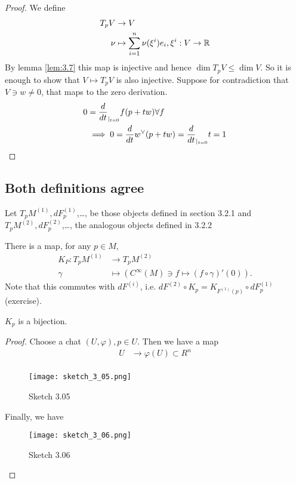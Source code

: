 \begin{proof} %
    We define \begin{align*}
        T_p V &\to V\\
        \nu&\mapsto \sum_{i=1}^n\nu(\xi^i)e_i,\xi^i:V\to \mathbb{R}
    \end{align*}
    By lemma \ref{lem:3.7} this map is injective and hence \(\dim T_pV \leq \dim V\). So it is enough to show that \(V\mapsto T_pV\) is also injective. 
    Suppose for contradiction that \(V\ni w\neq 0\), that maps to the zero derivation.
    \begin{align*}
        0&=\frac{d}{dt}_{|_{t=0}}f(p+tw)\forall f\\
        &\implies 0=\frac{d}{dt}w^\vee(p+tw)=\frac{d}{dt}_{|_{t=0}}t=1 \qedhere
    \end{align*}
\end{proof}

\subsection{Both definitions agree}
 Let \(T_pM^{(1)},dF_p^{(1)}\),\dots, be those objects defined in section 3.2.1 
and  \(T_pM^{(2)},dF_p^{(2)}\),\dots, the analogous objects defined in 3.2.2 

 There is a  map, for any  \(p\in M\),
\begin{align*}
    K_P:T_pM^{(1)}&\to T_pM^{(2)}\\
    \gamma& \mapsto (C^\infty(M)\ni f\mapsto (f\circ \gamma)'(0)).
\end{align*}
Note that this commutes with \(dF^{(i)}\), i.e. \(dF^{(2)}\circ K_p=K_{F^{(1)}(p)}\circ dF_p^{(1)}\) (exercise).

\begin{proposition}\label{prop:3.9}
    \(K_p\) is a bijection.
\end{proposition}

\begin{proof}
    Choose a chat \((U,\varphi),p\in U\). Then we have a map
    \begin{align*}
        U &\to \varphi(U)\subset R^n\\
    \end{align*}
    \begin{figure}[H]
        \centering
        \texttt{[image: sketch\_3\_05.png]}
        \caption{Sketch 3.05}
    \end{figure}
    Finally, we have 
    \begin{figure}[H]
        \centering
        \texttt{[image: sketch\_3\_06.png]}
        \caption{Sketch 3.06}
    \end{figure}
\end{proof}

